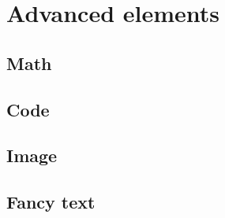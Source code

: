 \documentclass[nonacm]{acmart}
\begin{document}
\section{Advanced elements}

\subsection{Math}

\subsection{Code}

\subsection{Image}

\subsection{Fancy text}



\end{document}

